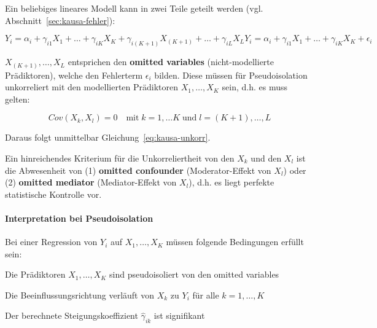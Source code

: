 \documentclass{article}
\numberwithin{equation}{section}
\begin{document}
Ein beliebiges lineares Modell kann in zwei Teile geteilt werden (vgl. Abschnitt~\ref{sec:kausa-fehler}):

\begin{subequations}
\begin{equation}
Y_i = \alpha_i + \gamma_{i1} X_1 + \dots + \gamma_{iK} X_K + \gamma_{i(K+1)} X_{(K+1)} + \dots + \gamma_{iL} X_L
\end{equation}
\begin{equation}
Y_i = \alpha_i + \gamma_{i1} X_1 + \dots + \gamma_{iK} X_K + \epsilon_i
\end{equation}
\end{subequations}

$X_{(K+1)}, \dots, X_L$ entsprichen den \textbf{omitted variables} (nicht-modellierte Prädiktoren), welche den Fehlerterm $\epsilon_i$ bilden. Diese müssen für Pseudoisolation unkorreliert mit den modellierten Prädiktoren $X_1, \dots, X_K$ sein, d.h. es muss gelten:

\begin{equation}
Cov(X_k,X_l) = 0 \quad \text{mit} \; k = 1, \dots K \; \text{und} \; l = (K+1), \dots, L
\end{equation}

Daraus folgt unmittelbar Gleichung~\ref{eq:kausa-unkorr}.

Ein hinreichendes Kriterium für die Unkorreliertheit von den $X_k$ und den $X_l$ ist die Abwesenheit von (1) \textbf{omitted confounder} (Moderator-Effekt von $X_l$) oder (2) \textbf{omitted mediator} (Mediator-Effekt von $X_l$), d.h. es liegt perfekte statistische Kontrolle vor.

\paragraph*{Interpretation bei Pseudoisolation}

Bei einer Regression von $Y_i$ auf $X_1, \dots, X_K$ müssen folgende Bedingungen erfüllt sein:

\begin{compactitem}
\item Die Prädiktoren $X_1 , \dots, X_K$ sind pseudoisoliert von den omitted variables
\item Die Beeinflussungsrichtung verläuft von $X_k$ zu $Y_i$ für alle $k = 1, \dots, K$
\item Der berechnete Steigungskoeffizient $\hat\gamma_{ik}$ ist signifikant
\end{compactitem}
\end{document}
